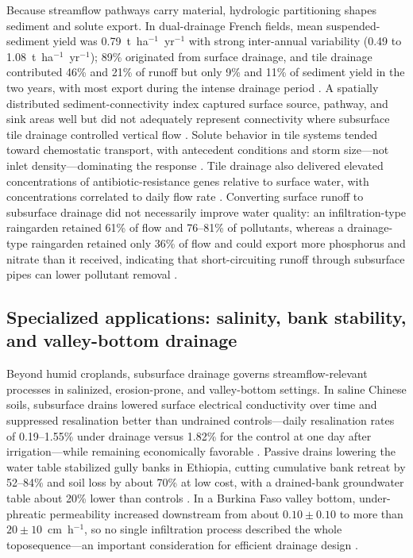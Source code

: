 Because streamflow pathways carry material, hydrologic partitioning shapes sediment and solute export. In dual-drainage French fields, mean suspended-sediment yield was 0.79~t~ha$^{-1}$~yr$^{-1}$ with strong inter-annual variability (0.49 to 1.08~t~ha$^{-1}$~yr$^{-1}$); 89\% originated from surface drainage, and tile drainage contributed 46\% and 21\% of runoff but only 9\% and 11\% of sediment yield in the two years, with most export during the intense drainage period \parencite{Gaillot2023b,Grangeon2021}. A spatially distributed sediment-connectivity index captured surface source, pathway, and sink areas well but did not adequately represent connectivity where subsurface tile drainage controlled vertical flow \parencite{Calsamiglia2018}. Solute behavior in tile systems tended toward chemostatic transport, with antecedent conditions and storm size---not inlet density---dominating the response \parencite{Stops2022}. Tile drainage also delivered elevated concentrations of antibiotic-resistance genes relative to surface water, with concentrations correlated to daily flow rate \parencite{Rieke2018}. Converting surface runoff to subsurface drainage did not necessarily improve water quality: an infiltration-type raingarden retained 61\% of flow and 76--81\% of pollutants, whereas a drainage-type raingarden retained only 36\% of flow and could export more phosphorus and nitrate than it received, indicating that short-circuiting runoff through subsurface pipes can lower pollutant removal \parencite{Xu2022}.

\subsection{Specialized applications: salinity, bank stability, and valley-bottom drainage}

Beyond humid croplands, subsurface drainage governs streamflow-relevant processes in salinized, erosion-prone, and valley-bottom settings. In saline Chinese soils, subsurface drains lowered surface electrical conductivity over time and suppressed resalination better than undrained controls---daily resalination rates of 0.19--1.55\% under drainage versus 1.82\% for the control at one day after irrigation---while remaining economically favorable \parencite{Yan2013,Chang2012}. Passive drains lowering the water table stabilized gully banks in Ethiopia, cutting cumulative bank retreat by 52--84\% and soil loss by about 70\% at low cost, with a drained-bank groundwater table about 20\% lower than controls \parencite{Zegeye2021}. In a Burkina Faso valley bottom, under-phreatic permeability increased downstream from about $0.10\pm0.10$ to more than $20\pm10$~cm~h$^{-1}$, so no single infiltration process described the whole toposequence---an important consideration for efficient drainage design \parencite{Keita2014}.

